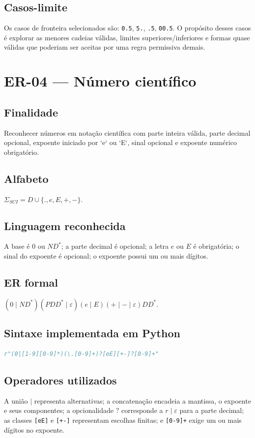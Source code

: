 \documentclass[12pt,a4paper,oneside]{report}
\begin{document}
\subsection{Casos-limite}
Os casos de fronteira selecionados são: \texttt{0.5}, \texttt{5.}, \texttt{.5}, \texttt{00.5}.
\medskip
O propósito desses casos é explorar as menores cadeias válidas, limites superiores/inferiores e formas quase válidas que poderiam ser aceitas por uma regra permissiva demais.

\section{ER-04 --- Número científico}
\subsection{Finalidade}
Reconhecer números em notação científica com parte inteira válida, parte decimal opcional, expoente iniciado por `e` ou `E`, sinal opcional e expoente numérico obrigatório.
\subsection{Alfabeto}
$\Sigma_{SCI}=D\cup\{.,e,E,+,-\}$.
\subsection{Linguagem reconhecida}
A base é $0$ ou $ND^*$; a parte decimal é opcional; a letra $e$ ou $E$ é obrigatória; o sinal do expoente é opcional; o expoente possui um ou mais dígitos.
\subsection{ER formal}
$(0\mid ND^*)(PDD^*\mid\varepsilon)(e\mid E)(+\mid-\mid\varepsilon)DD^*$.
\subsection{Sintaxe implementada em Python}
\begin{lstlisting}[language=Python]
r"(0|[1-9][0-9]*)(\.[0-9]+)?[eE][+-]?[0-9]+"
\end{lstlisting}
\subsection{Operadores utilizados}
A união $\mid$ representa alternativas; a concatenação encadeia a mantissa, o expoente e seus componentes; a opcionalidade $?$ corresponde a $r\mid\varepsilon$ para a parte decimal; as classes \texttt{[eE]} e \texttt{[+-]} representam escolhas finitas; e \texttt{[0-9]+} exige um ou mais dígitos no expoente.
\end{document}
